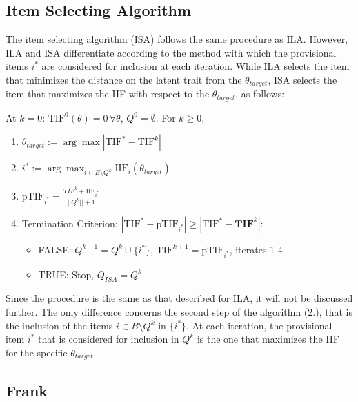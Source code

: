 \documentclass[12pt, a4paper, titilepage]{article}
\begin{document}
\subsection*{Item Selecting Algorithm}

The item selecting algorithm (ISA) follows the same procedure as ILA. However, ILA and ISA differentiate according to the method with which the provisional items $i^*$ are considered for inclusion at each iteration. While ILA selects the item that minimizes the distance on the latent trait from the $\theta_{target}$, ISA selects the item that maximizes the IIF with respect to the $\theta_{target}$, as follows: 

At $k = 0$: $\text{TIF}^0(\theta) = 0 \, \forall \theta$, $Q^0 = \emptyset$. For $k \geq 0$,

\begin{enumerate}
	\item $\theta_{target} := \arg \max |\text{TIF}^* - \text{TIF}^{k}|$
	\item $i^* := \arg \max_{i \in B\setminus Q^k} \text{IIF}_i(\theta_{target})$
	\item $\text{pTIF}_{i^*} = \frac{TIF^k + \text{IIF}_{i^*}}{||Q^{k}|| + 1}$
	\item Termination Criterion: $|\text{TIF}^* - \text{pTIF}_{i^*}| \geq |\text{TIF}^* - \mathbf{TIF}^{k}|$: 
	\begin{itemize}
		\item FALSE:  $Q^{k+1} = Q^{k} \cup \{i^*\}$, $\text{TIF}^{k+1} = \text{pTIF}_{i^*}$, iterates 1-4 
\item TRUE: Stop, %
$Q_{ISA} = Q^k$
	\end{itemize}
\end{enumerate}
Since the procedure is the same as that described for ILA, it will not be discussed further. The only difference concerns the second step of the algorithm (2.), that is the inclusion of the items $i \in B \setminus Q^k$ in $\{i^*\}$. At each iteration, the provisional item $i^*$ that is considered for inclusion in $Q^k$ is the one that maximizes the IIF for the specific $\theta_{target}$.



\subsection*{Frank}
\end{document}
